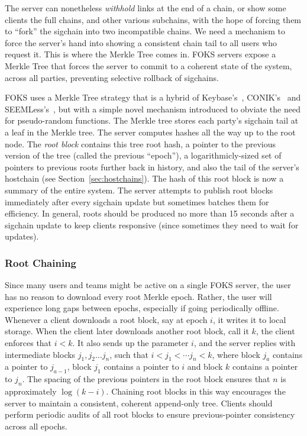The server can nonetheless \textit{withhold} links at the end of a chain, 
or show some clients the full chains, and other various subchains, with the
hope of forcing them to ``fork'' the sigchain into two incompatible chains.
We need a mechanism to force the server's hand into showing a consistent 
chain tail to all users who request it. This is where the Merkle Tree
comes in. FOKS servers expose a Merkle Tree that forces the server to commit
to a coherent state of the system, across all parties, preventing selective
rollback of sigchains. 

FOKS uses a Merkle Tree strategy that is a hybrid of Keybase's~\cite{keybase},
CONIK's~\cite{melara2015coniks} and SEEMLess's~\cite{chase2019seemless}, but
with a simple novel mechanism introduced to obviate the need for pseudo-random
functions. The Merkle tree stores each party's sigchain tail at a leaf 
in the Merkle tree. The server computes hashes all the way up to the root node.
The \textit{root block} contains this tree root hash, a pointer to the previous version of
the tree (called the previous ``epoch''), a logarithmicly-sized set of pointers
to previous roots further back in history, and also the tail of the 
server's hostchain (see Section~\ref{sec:hostchains}). The hash of this
root block is now a summary of the entire system. The server attempts to publish
root blocks immediately after every sigchain update but sometimes batches 
them for efficiency. In general, roots should be produced no more than
15 seconds after a sigchain update to keep clients responsive (since sometimes
they need to wait for updates).

\subsubsection{Root Chaining}

Since many users and teams might be active on a single FOKS server, 
the user has no reason to download every root Merkle epoch. Rather,
the user will experience long gaps between epochs, especially if going
periodically offline. Whenever a client downloads a root block,
say at epoch $i$, it writes it to local storage. When the client later
downloads another root block, call it $k$, the client enforces
that $i < k$. It also sends up the parameter $i$, and the server
replies with intermediate blocks $j_1, j_2 \dots j_n$, such that
$i < j_1 < \cdots j_n < k$,  where block $j_{a}$ contains
a pointer to $j_{a-1}$, block $j_1$ contains a pointer to $i$
and block $k$ contains a pointer to $j_n$. The spacing of the
previous pointers in the root block ensures that $n$ is approximately
$\log (k-i)$. Chaining root blocks in this way 
encourages the server to maintain a consistent, coherent append-only
tree. Clients should perform periodic audits of all root blocks
to ensure previous-pointer consistency across all epochs.

